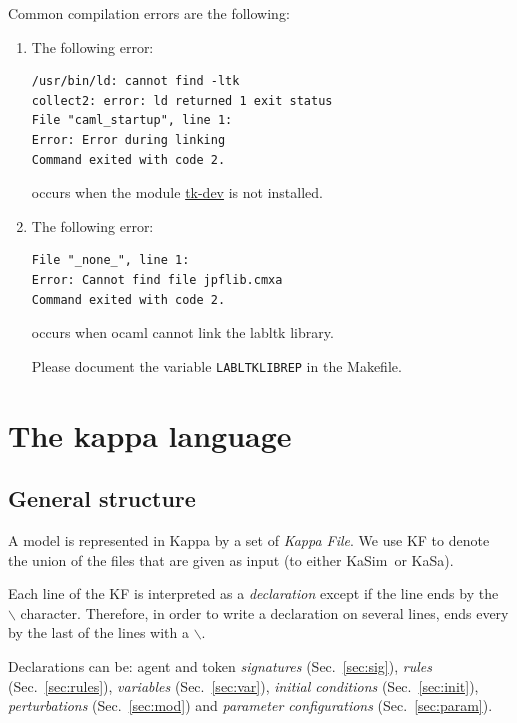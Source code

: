 \documentclass[11pt]{book}
\def\KaSim{\textsf{KaSim}}
\def\KaSa{\textsf{KaSa}}
\def\ttt#1{\texttt{#1}}
\def\bs{\backslash}
\begin{document}
Common compilation errors are the following:
\begin{enumerate}
\item The following error: 

\begin{verbatim}
/usr/bin/ld: cannot find -ltk
collect2: error: ld returned 1 exit status
File "caml_startup", line 1:
Error: Error during linking
Command exited with code 2.
\end{verbatim}

occurs when the module  \href{http://www.tcl.tk/}{tk-dev} is not installed. 
\item The following error:

\begin{verbatim}
File "_none_", line 1:
Error: Cannot find file jpflib.cmxa
Command exited with code 2.
\end{verbatim}

occurs when ocaml cannot link the labltk library. 

Please document the variable \texttt{LABLTKLIBREP} in the Makefile. 

\end{enumerate}

\chapter{The kappa language}\label{chap:kappa}

\section{General structure}
A model is represented in Kappa by a set of \emph{Kappa File}. We use
KF to denote the union of the files that are given
as input (to either \KaSim~or \KaSa).

Each line of the KF is interpreted as a
\emph{declaration} except if the line ends by
the~{\textquotesingle} \ttt{$\bs$}{\textquotesingle}
character. Therefore, in order to write a
declaration on several lines, ends every by the
last of the lines with a \ttt{$\bs$}.

Declarations can be: agent and token \emph{signatures}
(Sec.~\ref{sec:sig}), \emph{rules} (Sec.~\ref{sec:rules}),
\emph{variables} (Sec.~\ref{sec:var}), \emph{initial
  conditions} (Sec.~\ref{sec:init}),
\emph{perturbations} (Sec.~\ref{sec:mod}) and
\emph{parameter configurations} (Sec.~\ref{sec:param}).
\end{document}
